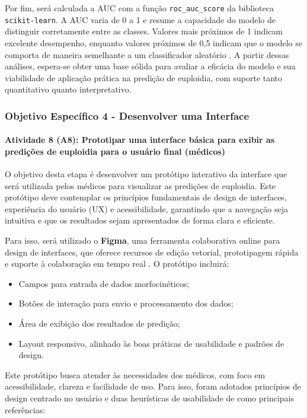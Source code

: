 Por fim, será calculada a AUC com a função \texttt{roc\_auc\_score} da biblioteca \texttt{scikit-learn}. A AUC varia de 0 a 1 e resume a capacidade do modelo de distinguir corretamente entre as classes. Valores mais próximos de 1 indicam excelente desempenho, enquanto valores próximos de 0{,}5 indicam que o modelo se comporta de maneira semelhante a um classificador aleatório \cite{vilela2022}. A partir dessas análises, espera-se obter uma base sólida para avaliar a eficácia do modelo e sua viabilidade de aplicação prática na predição de euploidia, com suporte tanto quantitativo quanto interpretativo.

\subsubsection{\textbf{Objetivo Específico 4} - Desenvolver uma Interface}

\paragraph{\textbf{Atividade 8 (A8):} Prototipar uma interface básica para exibir as predições de euploidia para o usuário final (médicos)}

O objetivo desta etapa é desenvolver um protótipo interativo da interface que será utilizada pelos médicos para visualizar as predições de euploidia. Este protótipo deve contemplar os princípios fundamentais de design de interfaces, experiência do usuário (UX) e acessibilidade, garantindo que a navegação seja intuitiva e que os resultados sejam apresentados de forma clara e eficiente.

Para isso, será utilizado o \textbf{Figma}, uma ferramenta colaborativa online para design de interfaces, que oferece recursos de edição vetorial, prototipagem rápida e suporte à colaboração em tempo real \cite{figma2024}. O protótipo incluirá:
\begin{itemize}
  \item Campos para entrada de dados morfocinéticos;
  \item Botões de interação para envio e processamento dos dados;
  \item Área de exibição dos resultados de predição;
  \item Layout responsivo, alinhado às boas práticas de usabilidade e padrões de design.
\end{itemize}

Este protótipo busca atender às necessidades dos médicos, com foco em acessibilidade, clareza e facilidade de uso. Para isso, foram adotados princípios de design centrado no usuário e duas heurísticas de usabilidade de  como principais referências:


